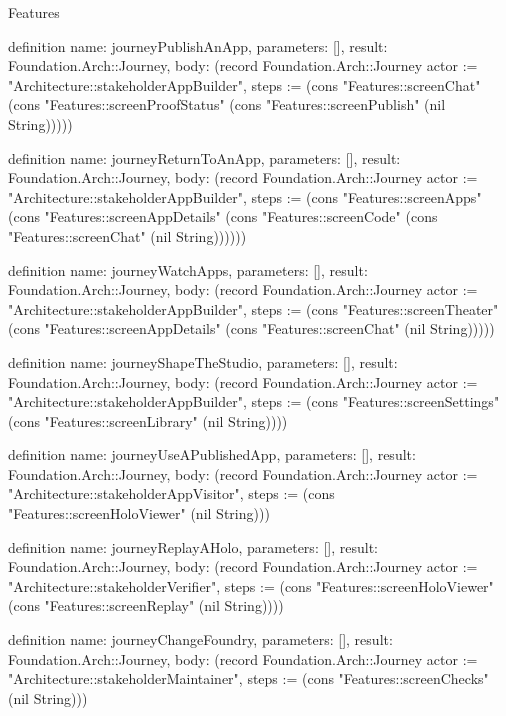 \begin{lexlean}{Features}
\begin{semanticmodule}
definition{
  name: journeyPublishAnApp,
  parameters: [],
  result: Foundation.Arch::Journey,
  body: (record Foundation.Arch::Journey {actor := "Architecture::stakeholderAppBuilder", steps := (cons "Features::screenChat" (cons "Features::screenProofStatus" (cons "Features::screenPublish" (nil String))))})
}

definition{
  name: journeyReturnToAnApp,
  parameters: [],
  result: Foundation.Arch::Journey,
  body: (record Foundation.Arch::Journey {actor := "Architecture::stakeholderAppBuilder", steps := (cons "Features::screenApps" (cons "Features::screenAppDetails" (cons "Features::screenCode" (cons "Features::screenChat" (nil String)))))})
}

definition{
  name: journeyWatchApps,
  parameters: [],
  result: Foundation.Arch::Journey,
  body: (record Foundation.Arch::Journey {actor := "Architecture::stakeholderAppBuilder", steps := (cons "Features::screenTheater" (cons "Features::screenAppDetails" (cons "Features::screenChat" (nil String))))})
}

definition{
  name: journeyShapeTheStudio,
  parameters: [],
  result: Foundation.Arch::Journey,
  body: (record Foundation.Arch::Journey {actor := "Architecture::stakeholderAppBuilder", steps := (cons "Features::screenSettings" (cons "Features::screenLibrary" (nil String)))})
}

definition{
  name: journeyUseAPublishedApp,
  parameters: [],
  result: Foundation.Arch::Journey,
  body: (record Foundation.Arch::Journey {actor := "Architecture::stakeholderAppVisitor", steps := (cons "Features::screenHoloViewer" (nil String))})
}

definition{
  name: journeyReplayAHolo,
  parameters: [],
  result: Foundation.Arch::Journey,
  body: (record Foundation.Arch::Journey {actor := "Architecture::stakeholderVerifier", steps := (cons "Features::screenHoloViewer" (cons "Features::screenReplay" (nil String)))})
}

definition{
  name: journeyChangeFoundry,
  parameters: [],
  result: Foundation.Arch::Journey,
  body: (record Foundation.Arch::Journey {actor := "Architecture::stakeholderMaintainer", steps := (cons "Features::screenChecks" (nil String))})
}
\end{semanticmodule}
\end{lexlean}
